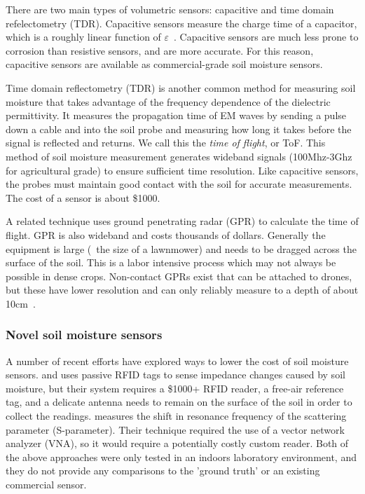 \documentclass[12pt]{article}
\begin{document}
There are two main types of volumetric sensors: capacitive and time
domain refelectometry (TDR). Capacitive sensors measure the charge
time of a capacitor, which is a roughly linear function of
$\varepsilon$~\cite{sensorOverview}. Capacitive sensors are much less
prone to corrosion than resistive sensors, and are more accurate. For
this reason, capacitive sensors are available as commercial-grade soil
moisture sensors. 

Time domain reflectometry (TDR) is another common method for measuring
soil moisture that takes advantage of the frequency dependence of the
dielectric permittivity. It measures the propagation time of EM waves
by sending a pulse down a cable and into the soil probe and measuring
how long it takes before the signal is reflected and returns. We call
this the \emph{time of flight}, or ToF. This method of soil moisture
measurement generates wideband signals (100Mhz-3Ghz for agricultural
grade) to ensure sufficient time resolution. Like capacitive sensors,
the probes must maintain good contact with the soil for accurate
measurements. The cost of a sensor is about \$1000.

A related technique uses ground penetrating radar (GPR) to calculate
the time of flight. GPR is also wideband and costs thousands of
dollars. Generally the equipment is large (~the size of a lawnmower)
and needs to be dragged across the surface of the soil. This is a
labor intensive process which may not always be possible in dense
crops. Non-contact GPRs exist that can be attached to drones, but
these have lower resolution and can only reliably measure to a depth
of about 10cm~\cite{gprEdaphic}.

\subsubsection*{Novel soil moisture sensors}
A number of recent efforts have explored ways to lower the cost of
soil moisture sensors. \cite{Hasan2013} and uses passive RFID tags to sense
impedance changes caused by soil moisture, but their system requires a
\$1000+ RFID reader, a free-air reference tag, and a delicate antenna
needs to remain on the surface of the soil in order to collect the
readings. \cite{Dey2016} measures the shift in resonance frequency of the
scattering parameter (S-parameter). Their technique required the use
of a vector network analyzer (VNA), so it would require a potentially
costly custom reader. Both of the above approaches were only tested in
an indoors laboratory environment, and they do not provide any
comparisons to the 'ground truth' or an existing commercial sensor.
\end{document}
